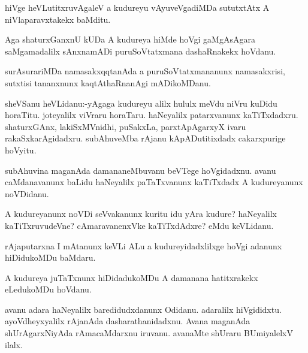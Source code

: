 \documentclass{article}
\begin{document}
\begin{mn}%
hiVge heVLutitxruvAgaleV a kudureyu vAyuveVgadiMDa sututxtAtx A niVlaparavxtakekx baMditu.
\end{mn}

\begin{mn}%
Aga shaturxGanxnU kUDa A kudureya hiMde hoVgi gaMgAsAgara saMgamadalilx sAnxnamADi 
puruSoVtatxmana dashaRnakekx hoVdanu.
\end{mn}

\begin{mn}%
surAsurariMDa namasakxqqtanAda a puruSoVtatxmananunx namasakxrisi, sutxtisi tananxnunx 
kaqtAthaRnanAgi mADikoMDanu.
\end{mn}


\begin{mn}%
sheVSanu heVLidanu:-yAgaga kudureyu alilx hululx meVdu niVru kuDidu horaTitu. joteyalilx 
viVraru horaTaru. haNeyalilx patarxvanunx kaTiTxdadxru. shaturxGAnx, lakiSxMVnidhi, 
puSakxLa, parxtApAgarxyX ivaru rakaSxkarAgidadxru. subAhuveMba rAjanu kApADutitixdadx 
cakarxpurige hoVyitu.
\end{mn}

\begin{mn}%
subAhuvina maganAda damananeMbuvanu beVTege hoVgidadxnu. avanu caMdanavanunx baLidu 
haNeyalilx paTaTxvanunx kaTiTxdadx A kudureyanunx noVDidanu.
\end{mn}

\begin{mn}%
A kudureyanunx noVDi seVvakanunx kuritu idu yAra kudure? haNeyalilx kaTiTxruvudeVne? 
cAmaravanenxVke kaTiTxdAdxre? eMdu keVLidanu.
\end{mn}

\begin{mn}%
rAjaputarxna I mAtanunx keVLi ALu a kudureyidadxlilxge hoVgi adanunx hiDidukoMDu baMdaru.
\end{mn}

\begin{mn}%
A kudureya juTaTxnunx hiDidadukoMDu A damanana  hatitxrakekx eLedukoMDu hoVdanu.
\end{mn}

\begin{mn}%
avanu adara haNeyalilx baredidudxdanunx Odidanu. adaralilx hiVgididxtu. ayoVdheyxyalilx 
rAjanAda dasharathanidadxnu. Avana maganAda shUrAgarxNiyAda rAmacaMdarxnu iruvanu. 
avanaMte shUraru BUmiyalelxV ilalx.
\end{mn}
\end{document}
